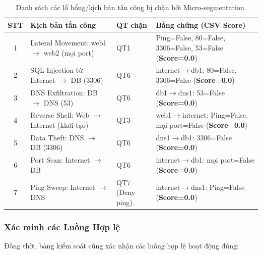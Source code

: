 \begin{table}[H]
    \centering
    \caption{Danh sách các lỗ hổng/kịch bản tấn công bị chặn bởi Micro-segmentation.}
    \label{tab:blocked_threats}
    \begin{tabular}{|c|p{3.5cm}|p{2.5cm}|p{5cm}|}
        \hline
        \textbf{STT} & \textbf{Kịch bản tấn công} & \textbf{QT chặn} & \textbf{Bằng chứng (CSV Score)} \\
        \hline
        1 & Lateral Movement: web1 $\rightarrow$ web2 (mọi port) & QT1 & Ping=False, 80=False, 3306=False, 53=False (\textbf{Score=0.0}) \\
        \hline
        2 & SQL Injection từ Internet $\rightarrow$ DB (3306) & QT6 & internet$\rightarrow$db1: 80=False, 3306=False (\textbf{Score=0.0}) \\
        \hline
        3 & DNS Exfiltration: DB $\rightarrow$ DNS (53) & QT6 & db1$\rightarrow$dns1: 53=False (\textbf{Score=0.0}) \\
        \hline
        4 & Reverse Shell: Web $\rightarrow$ Internet (khởi tạo) & QT3 & web1$\rightarrow$internet: Ping=False, mọi port=False (\textbf{Score=0.0}) \\
        \hline
        5 & Data Theft: DNS $\rightarrow$ DB (3306) & QT6 & dns1$\rightarrow$db1: 3306=False (\textbf{Score=0.0}) \\
        \hline
        6 & Port Scan: Internet $\rightarrow$ DB & QT6 & internet$\rightarrow$db1: mọi port=False (\textbf{Score=0.0}) \\
        \hline
        7 & Ping Sweep: Internet $\rightarrow$ DNS & QT7 (Deny ping) & internet$\rightarrow$dns1: Ping=False (\textbf{Score=0.0}) \\
        \hline
    \end{tabular}
\end{table}

\subsubsection{Xác minh các Luồng Hợp lệ}

Đồng thời, bảng kiểm soát cũng xác nhận các luồng hợp lệ hoạt động đúng:

